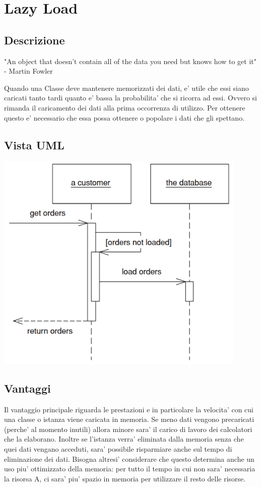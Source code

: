 \chapter{Lazy Load}

\section{Descrizione}

"An object that doesn’t contain all of the data you need but knows how to get it" - Martin Fowler

Quando una Classe deve mantenere memorizzati dei dati, e' utile che essi siano caricati tanto tardi quanto e' bassa la probabilita' che si ricorra ad essi.
Ovvero si rimanda il caricamento dei dati alla prima occorrenza di utilizzo.
Per ottenere questo e' necessario che essa possa ottenere o popolare i dati che gli spettano.

\section{Vista UML}

\begin{center}
    \includegraphics[width=12cm]{images/lazy-load/LazyLoad.png}
\end{center}

\section{Vantaggi}

Il vantaggio principale riguarda le prestazioni e in particolare la velocita' con cui una classe o istanza viene caricata in memoria.
Se meno dati vengono precaricati (perche' al momento inutili) allora minore sara' il carico di lavoro dei calcolatori che la elaborano.
Inoltre se l'istanza verra' eliminata dalla memoria senza che quei dati vengano acceduti, sara' possibile risparmiare anche sul tempo di eliminazione dei dati.
Bisogna altresi' considerare che questo determina anche un uso piu' ottimizzato della memoria: per tutto il tempo in cui non sara' necessaria la risorsa A, ci sara' piu' spazio in memoria per utilizzare il resto delle risorse.

